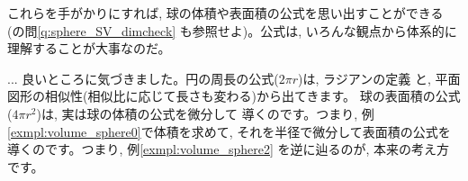 これらを手がかりにすれば, 球の体積や表面積の公式を思い出すことができる
(の問\ref{q:sphere_SV_dimcheck}
も参照せよ)。公式は, いろんな観点から体系的に理解することが大事なのだ。

\begin{faq}{\small{} ... 
良いところに気づきました。円の周長の公式($2\pi r$)は, ラジアンの定義
と, 平面図形の相似性(相似比に応じて長さも変わる)から出てきます。
球の表面積の公式($4\pi r^2$)は, 実は球の体積の公式を微分して
導くのです。つまり, 例\ref{exmpl:volume_sphere0}で体積を求めて, 
それを半径で微分して表面積の公式を導くのです。つまり, 例\ref{exmpl:volume_sphere2}
を逆に辿るのが, 本来の考え方です。}\end{faq}
\mv

